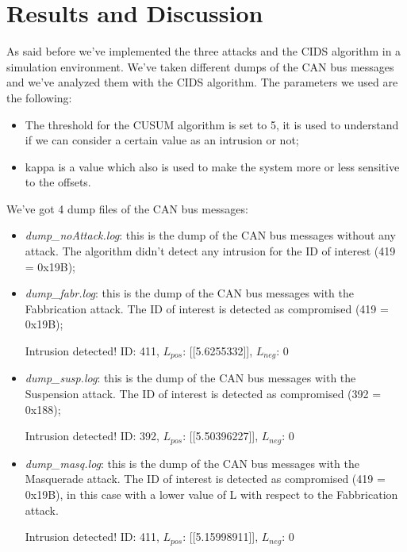 \documentclass[12pt]{article}
\begin{document}
\section{Results and Discussion}
As said before we've implemented the three attacks and the CIDS algorithm in a simulation environment.
We've taken different dumps of the CAN bus messages and we've analyzed them with the CIDS algorithm. 
The parameters we used are the following:
\begin{itemize}
    \item The threshold for the CUSUM algorithm is set to 5, it is used to understand if we can consider a certain 
    value as an intrusion or not;
    \item kappa is a value which also is used to make the system more or less sensitive to the offsets.
\end{itemize}
We've got 4 dump files of the CAN bus messages:
\begin{itemize}
    \item \textit{dump\_noAttack.log}: this is the dump of the CAN bus messages without any attack. The algorithm 
    didn't detect any intrusion for the ID of interest (419 = 0x19B);
    \item \textit{dump\_fabr.log}: this is the dump of the CAN bus messages with the Fabbrication attack. The ID 
    of interest is detected as compromised (419 = 0x19B);
    \begin{center}
        Intrusion detected! ID: 411, $L_{pos}$: [[5.6255332]], $L_{neg}$: 0
    \end{center}
    \item \textit{dump\_susp.log}: this is the dump of the CAN bus messages with the Suspension 
    attack. The ID of interest is detected as compromised (392 = 0x188);
    \begin{center}
        Intrusion detected! ID: 392, $L_{pos}$: [[5.50396227]], $L_{neg}$: 0
    \end{center}
    \item \textit{dump\_masq.log}: this is the dump of the CAN bus messages with the Masquerade attack. 
    The ID of interest is detected as compromised (419 = 0x19B), in this case with a lower value 
    of L with respect to the Fabbrication attack. 
    \begin{center}
        Intrusion detected! ID: 411, $L_{pos}$: [[5.15998911]], $L_{neg}$: 0
    \end{center}
\end{itemize}

\printbibliography 
\end{document}
